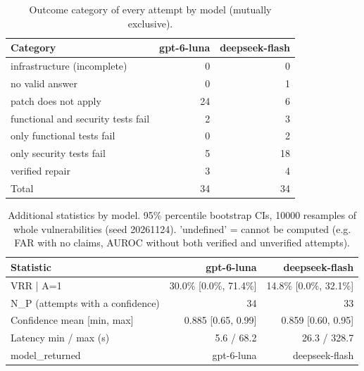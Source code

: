 \begin{table}[ht]
\centering
\caption{Outcome category of every attempt by model (mutually exclusive).}
\label{tab:final-categories}
\begin{tabular}{lrr}
\hline
Category & gpt-6-luna & deepseek-flash \\
\hline
infrastructure (incomplete) & 0 & 0 \\
no valid answer & 0 & 1 \\
patch does not apply & 24 & 6 \\
functional and security tests fail & 2 & 3 \\
only functional tests fail & 0 & 2 \\
only security tests fail & 5 & 18 \\
verified repair & 3 & 4 \\
Total & 34 & 34 \\
\hline
\end{tabular}
\end{table}
\begin{table}[ht]
\centering
\caption{Additional statistics by model. 95\% percentile bootstrap CIs, 10000 resamples of whole vulnerabilities (seed 20261124). 'undefined' = cannot be computed (e.g. FAR with no claims, AUROC without both verified and unverified attempts).}
\label{tab:final-extra}
\begin{tabular}{lrr}
\hline
Statistic & gpt-6-luna & deepseek-flash \\
\hline
VRR | A=1 & 30.0\% [0.0\%, 71.4\%] & 14.8\% [0.0\%, 32.1\%] \\
N\_P (attempts with a confidence) & 34 & 33 \\
Confidence mean [min, max] & 0.885 [0.65, 0.99] & 0.859 [0.60, 0.95] \\
Latency min / max (s) & 5.6 / 68.2 & 26.3 / 328.7 \\
model\_returned & gpt-6-luna & deepseek-flash \\
\hline
\end{tabular}
\end{table}

